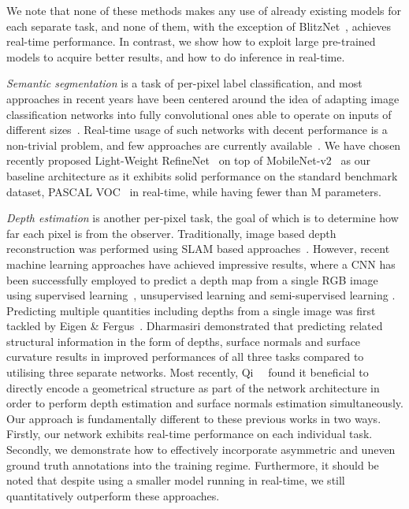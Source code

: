 \documentclass[letterpaper, 10 pt, conference]{ieeeconf}
\begin{document}
We note that none of these methods makes any use of already existing models for each separate task, and none of them, with the exception of BlitzNet~\cite{DvornikSMS17}, achieves real-time performance. In contrast, we show how to exploit large pre-trained models to acquire better results, and how to do inference in real-time.

{\em Semantic segmentation} is a task of per-pixel label classification, and most approaches in recent years have been centered around the idea of adapting image classification networks into fully convolutional ones able to operate on inputs of different sizes~\cite{LongSD15, WuSH16e, ChenPSA17}. Real-time usage of such networks with decent performance is a non-trivial problem, and few approaches are currently available~\cite{ZhaoQSSJ17, PaszkeCKC16, LiLLLT17, nekrasovlight}. We have chosen recently proposed Light-Weight RefineNet~\cite{nekrasovlight} on top of MobileNet-v2~\cite{abs-1801-04381} as our baseline architecture as it exhibits solid performance on the standard benchmark dataset, PASCAL VOC~\cite{EveringhamGWWZ10} in real-time, while having fewer than M parameters.

{\em Depth estimation} is another per-pixel task, the goal of which is to determine how far each pixel is from the observer. Traditionally, image based depth reconstruction was performed using SLAM based approaches~\cite{Newcombe2011,engel2014lsd,klein2007parallel}. However, recent machine learning approaches have achieved impressive results, where a CNN has been successfully employed to predict a depth map from a single RGB image using supervised learning~\cite{EigenF15,EigenNIPS,Laina2016,Liu}, unsupervised learning \cite{garg2016unsupervised,godard2017unsupervised} and semi-supervised learning \cite{kuznietsov2017semi}. Predicting multiple quantities including depths from a single image was first tackled by Eigen \& Fergus~\cite{EigenF15}. Dharmasiri \etal\cite{dharmasiri2017joint} demonstrated that predicting related structural information in the form of depths, surface normals and surface curvature results in improved performances of all three tasks compared to utilising three separate networks. Most recently, Qi~\etal~\cite{qi2018geonet} found it beneficial to directly encode a geometrical structure as part of the network architecture in order to perform depth estimation and surface normals estimation simultaneously. Our approach is fundamentally different to these previous works in two ways. Firstly, our network exhibits real-time performance on each individual task. Secondly, we demonstrate how to effectively incorporate asymmetric and uneven ground truth annotations into the training regime. Furthermore, it should be noted that despite using a smaller model running in real-time, we still quantitatively outperform these approaches.
\end{document}
